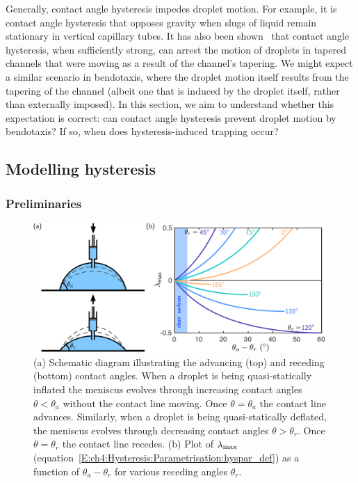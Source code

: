 Generally, contact angle hysteresis impedes droplet motion. For example, it is contact angle hysteresis that opposes gravity when slugs of liquid remain stationary in vertical capillary tubes. It has also been shown~\citep{Prakash2008Science, Bush2010AdvCollIntsci} that contact angle hysteresis, when sufficiently strong, can  arrest the motion of droplets in tapered channels that were moving as a result of the channel's tapering. We might expect a similar scenario in bendotaxis, where the droplet motion itself results from the tapering of the channel (albeit one that is induced by the droplet itself, rather than externally imposed). In this section, we aim to understand whether this expectation is correct: can contact angle hysteresis prevent droplet motion by bendotaxis? If so, when does hysteresis-induced trapping occur?

\subsection{Modelling hysteresis}\label{S:Ch4:hysteresis:modelling}
\subsubsection{Preliminaries}
\begin{figure}[t]
\includegraphics[scale=0.48]{cahys_primer}
\caption{(a) Schematic diagram illustrating the advancing (top) and receding (bottom) contact angles. When a droplet is being quasi-statically inflated the meniscus evolves through increasing contact angles $\theta < \theta_a$ without the contact line moving. Once $\theta = \theta_a$ the contact line advances. Similarly, when a droplet is being quasi-statically deflated, the meniscus evolves through decreasing contact angles $\theta > \theta_r$. Once $\theta = \theta_r$ the contact line recedes. (b) Plot of $\lambda_{\text{max}}$ (equation~\eqref{E:ch4:Hysteresis:Parametrisation:hyspar_def}) as a function of $\theta_a - \theta_r$ for various receding angles $\theta_r$.  }\label{fig:Ch4:Hysteresis:primer}
\end{figure}

